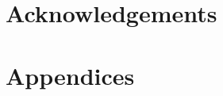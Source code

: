 \documentclass[authoryear,preprint,review,12pt]{elsarticle}
\begin{document}
\section*{Acknowledgements}

\section*{Appendices}




\end{document}

